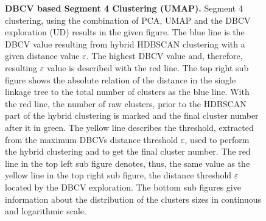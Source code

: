 \begin{figure}[!hbt]
\begin{subfigure}[b]{0.475\textwidth}
    \end{subfigure}
    \caption[\Acrshort{DBCV} based Segment 4 Clustering (\Acrshort{UMAP})]{\textbf{\Acrshort{DBCV} based Segment 4 Clustering (\Acrshort{UMAP}).} Segment 4 clustering, using the combination of \gls{PCA}, \gls{UMAP} and the \gls{DBCV} exploration (UD) results in the given figure. The blue line is the \gls{DBCV} value resulting from hybrid \gls{HDBSCAN} clustering with a given distance value $\varepsilon$. The highest \gls{DBCV} value and, therefore, resulting $\varepsilon$ value is described with the red line. The top right sub figure shows the absolute relation of the distance in the single linkage tree to the total number of clusters as the blue line. With the red line, the number of raw clusters, prior to the \gls{HDBSCAN} part of the hybrid clustering is marked and the final cluster number after it in green. The yellow line describes the threshold, extracted from the maximum \glspl{DBCV} distance threshold $\varepsilon$, used to perform the hybrid clustering and to get the final cluster number. The red line in the top left sub figure denotes, thus, the same value as the yellow line in the top right sub figure, the distance threshold $\varepsilon$ located by the \gls{DBCV} exploration. The bottom sub figures give information about the distribution of the clusters sizes in continuous and logarithmic scale.}
    \label{fig:UMAP_Cluster_DBCV_4}
\end{figure}

